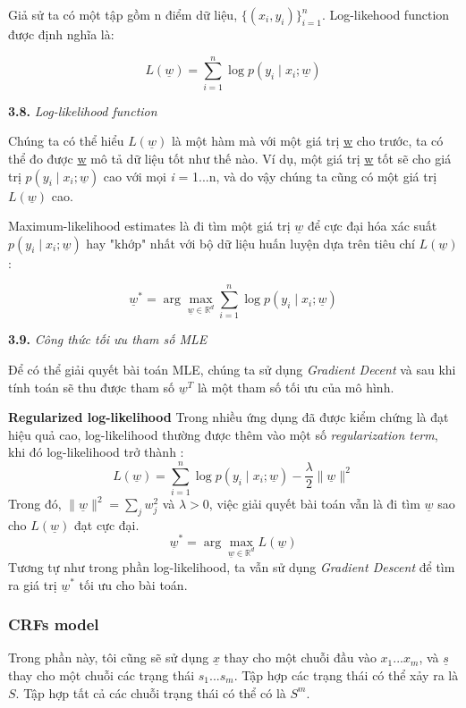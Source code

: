 Giả sử ta có một tập gồm n điểm dữ liệu, $\{(x_i,y_i)\}_{i=1}^{n}$. Log-likehood function được định nghĩa là:

$$L(\underline{w}) = \sum_{i=1}^{n}\log p(y_i\mid x_i; \underline{w})$$
\begin{center}

\vspace{0.3cm}
\textbf{3.8.} \textit{Log-likelihood function}    
\end{center}
Chúng ta có thể hiểu $L(\underline{w})$ là một hàm mà với một giá trị \underline{w} cho trước, ta có thể đo được \underline{w} mô tả dữ liệu tốt như thế nào. Ví dụ, một giá trị \underline{w} tốt sẽ cho giá trị $p(y_i \mid x_i; \underline{w})$ cao với mọi \textit{i} = 1...n, và do vậy chúng ta cũng có một giá trị $L(\underline{w})$ cao.

Maximum-likelihood estimates là đi tìm một giá trị $\underline{w}$ để cực đại hóa xác suất $p(y_i\mid x_i ; \underline{w})$ hay "khớp" nhất với bộ dữ liệu huấn luyện dựa trên tiêu chí $L(\underline{w})$:

$$\underline{w}^* = \arg \max_{\underline{w} \in \mathbb{R}^d} \sum_{i=1}^n \log p(y_i \mid x_i; \underline{w})$$

\begin{center}

\vspace{0.3cm}
\textbf{3.9.} \textit{Công thức tối ưu tham số MLE}    
\end{center}

Để có thể giải quyết bài toán MLE, chúng ta sử dụng \textit{Gradient Decent} và sau khi tính toán sẽ thu được tham số $\underline{w}^T$ là một tham số tối ưu của mô hình.

\vspace{0.3cm}
\textbf{Regularized log-likelihood}
Trong nhiều ứng dụng đã được kiểm chứng là đạt hiệu quả cao, log-likelihood thường được thêm vào một số \textit{regularization term}, khi đó log-likelihood trở thành :
$$L(\underline{w}) = \sum_{i=1}^{n}\log p(y_i\mid x_i; \underline{w}) - \frac{\lambda}{2}\| \underline{w}\|^2$$
Trong đó, $\|\underline{w}\|^2 = \sum_j w^2_j$ và $\lambda > 0$,
việc giải quyết bài toán vẫn là đi tìm $\underline{w}$ sao cho $L(\underline{w})$ đạt cực đại.
$$\underline{w}^* = \arg \max_{\underline{w} \in \mathbb{R}^d} L(\underline{w})$$
Tương tự như trong phần log-likelihood, ta vẫn sử dụng \textit{Gradient Descent} để tìm ra giá trị $\underline{w}^*$ tối ưu cho bài toán.

\subsubsection{CRFs model}
Trong phần này, tôi cũng sẽ sử dụng $\underline{x}$ thay cho một chuỗi đầu vào $x_1 ... x_m$, và $\underline{s}$ thay cho một chuỗi các trạng thái $s_1 ... s_m$. Tập hợp các trạng thái có thể xảy ra là $S$. Tập hợp tất cả các chuỗi trạng thái có thể có là $S^m$. 

